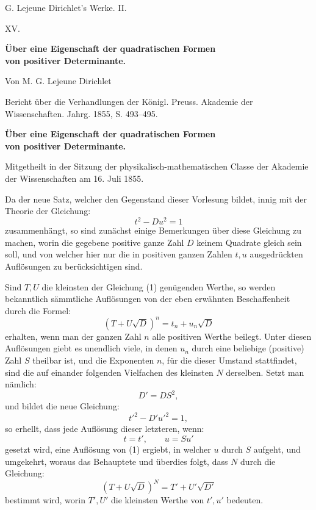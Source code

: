 \documentclass[11pt]{article}
\begin{document}
\begin{center}
{\Large G. Lejeune Dirichlet's Werke. II.}\par\vspace{1.2em}
{\Large XV.}\par\vspace{0.5em}
{\LARGE \textbf{Über eine Eigenschaft der quadratischen Formen\\ von positiver Determinante.}}\par\vspace{1em}
{\large Von M. G. Lejeune Dirichlet}\par\vspace{0.5em}
{\small Bericht über die Verhandlungen der Königl. Preuss. Akademie der Wissenschaften. Jahrg. 1855, S. 493--495.}
\end{center}

\begin{center}
{\large \textbf{Über eine Eigenschaft der quadratischen Formen\\ von positiver Determinante.}}\par
{\small Mitgetheilt in der Sitzung der physikalisch-mathematischen Classe der Akademie der Wissenschaften am 16. Juli 1855.}
\end{center}

Da der neue Satz, welcher den Gegenstand dieser Vorlesung bildet, innig mit der Theorie der Gleichung:
\[
\tag{1} t^2-Du^2=1
\]
zusammenhängt, so sind zunächst einige Bemerkungen über diese Gleichung zu machen, worin die gegebene positive ganze Zahl \(D\) keinem Quadrate gleich sein soll, und von welcher hier nur die in positiven ganzen Zahlen \(t,u\) ausgedrückten Auflösungen zu berücksichtigen sind.

Sind \(T,U\) die kleinsten der Gleichung (1) genügenden Werthe, so werden bekanntlich sämmtliche Auflösungen von der eben erwähnten Beschaffenheit durch die Formel:
\[
(T+U\sqrt D)^n=t_n+u_n\sqrt D
\]
erhalten, wenn man der ganzen Zahl \(n\) alle positiven Werthe beilegt. Unter diesen Auflösungen giebt es unendlich viele, in denen \(u_n\) durch eine beliebige (positive) Zahl \(S\) theilbar ist, und die Exponenten \(n\), für die dieser Umstand stattfindet, sind die auf einander folgenden Vielfachen des kleinsten \(N\) derselben. Setzt man nämlich:
\[
D'=DS^2,
\]
und bildet die neue Gleichung:
\[
t'^2-D'u'^2=1,
\]
so erhellt, dass jede Auflösung dieser letzteren, wenn:
\[
t=t',\qquad u=Su'
\]
gesetzt wird, eine Auflösung von (1) ergiebt, in welcher \(u\) durch \(S\) aufgeht, und umgekehrt, woraus das Behauptete und überdies folgt, dass \(N\) durch die Gleichung:
\[
(T+U\sqrt D)^N=T'+U'\sqrt {D'}
\]
bestimmt wird, worin \(T',U'\) die kleinsten Werthe von \(t',u'\) bedeuten.
\end{document}
